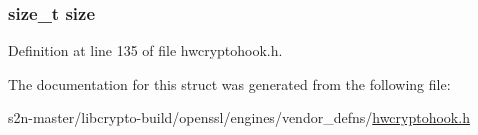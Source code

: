 \subsubsection[{\texorpdfstring{size}{size}}]{\setlength{\rightskip}{0pt plus 5cm}size\+\_\+t size}\hypertarget{struct_h_w_crypto_hook___m_p_i_struct_a854352f53b148adc24983a58a1866d66}{}\label{struct_h_w_crypto_hook___m_p_i_struct_a854352f53b148adc24983a58a1866d66}


Definition at line 135 of file hwcryptohook.\+h.



The documentation for this struct was generated from the following file\+:\begin{DoxyCompactItemize}
\item 
s2n-\/master/libcrypto-\/build/openssl/engines/vendor\+\_\+defns/\hyperlink{hwcryptohook_8h}{hwcryptohook.\+h}\end{DoxyCompactItemize}
